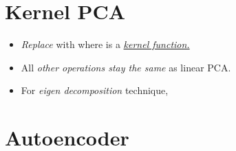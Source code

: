 \documentclass[
	number={7},
	title={Principal Component Analysis}
]{cs584notes}
\begin{document}
\section{Kernel PCA}\label{sec:kernel-pca}
\begin{itemize}
	\item \emph{Replace}  with  where \data{$\Phi(\cdot)$} is a \hyperref[sec:kernel-method]{\emph{kernel function.}}
	\item All \emph{other operations stay the same} as linear PCA\@.
	\item For \emph{eigen decomposition} technique,
\end{itemize}

\section{Autoencoder}\label{sec:autoencoder}
\end{document}
